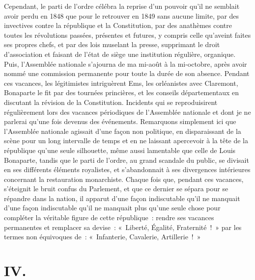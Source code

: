 \documentclass[french,twoside]{book} %
\newcommand\chapteropen{} %
\newcommand\chapterclose{} %
\begin{document}
Cependant, le parti de l’ordre célébra la reprise d’un pouvoir qu’il ne semblait avoir perdu en 1848 que pour le retrouver en 1849 sans aucune limite, par des invectives contre la république et la Constitution, par des anathèmes contre toutes les révolutions passées, présentes et futures, y compris celle qu’aveint faites ses propres chefs, et par des lois muselant la presse, supprimant le droit d’association et faisant de l’état de siège une institution régulière, organique. Puis, l’Assemblée nationale s’ajourna de ma mi-août à la mi-octobre, après avoir nommé une commission permanente pour toute la durée de son absence. Pendant ces vacances, les légitimistes intriguèrent Ems, les orléanistes avec Claremont, Bonaparte le fit par des tournées princières, et les conseils départementaux en discutant la révision de la Constitution. Incidents qui se reproduisirent régulièrement lors des vacances périodiques de l’Assemblée nationale et dont je ne parlerai qu’une fois devenus des événements. Remarquons simplement ici que l’Assemblée nationale agissait d’une façon non politique, en disparaissant de la scène pour un long intervalle de temps et en ne laissant apercevoir à la tête de la république qu’une seule silhouette, même aussi lamentable que celle de Louis Bonaparte, tandis que le parti de l’ordre, au grand scandale du public, se divisait en ses différents éléments royalistes, et s’abandonnait à ses divergences intérieures concernant la restauration monarchiste. Chaque fois que, pendant ces vacances, s’éteignit le bruit confus du Parlement, et que ce dernier se sépara pour se répandre dans la nation, il apparut d’une façon indiscutable qu’il ne manquait d’une façon indiscutable qu’il ne manquait plus qu’une seule chose pour compléter la véritable figure de cette république : rendre ses vacances permanentes et remplacer sa devise : « Liberté, Égalité, Fraternité ! » par les termes non équivoques de : « Infanterie, Cavalerie, Artillerie ! »
\chapterclose


\chapteropen
\chapter[{IV.}]{IV.}\renewcommand{\leftmark}{IV.}
\end{document}
